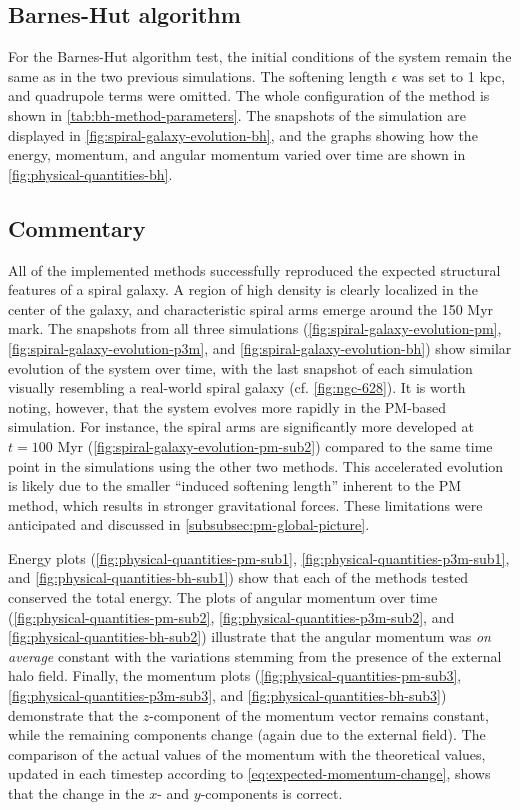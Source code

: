 \subsection{Barnes-Hut algorithm}
For the Barnes-Hut algorithm test, the initial conditions of the system remain the same as in the two previous simulations.
The softening length $\epsilon$ was set to 1 kpc, and quadrupole terms were omitted.
The whole configuration of the method is shown in \autoref{tab:bh-method-parameters}.
The snapshots of the simulation are displayed in \autoref{fig:spiral-galaxy-evolution-bh}, and the graphs showing how the energy, momentum, and angular momentum varied over time are shown in \autoref{fig:physical-quantities-bh}.

\subsection{Commentary}
All of the implemented methods successfully reproduced the expected structural features of a spiral galaxy.
A region of high density is clearly localized in the center of the galaxy, and characteristic spiral arms emerge around the 150 Myr mark.
The snapshots from all three simulations (\autoref{fig:spiral-galaxy-evolution-pm}, \autoref{fig:spiral-galaxy-evolution-p3m}, and \autoref{fig:spiral-galaxy-evolution-bh}) show similar evolution of the system over time, with the last snapshot of each simulation visually resembling a real-world spiral galaxy (cf. \autoref{fig:ngc-628}).
It is worth noting, however, that the system evolves more rapidly in the PM-based simulation.
For instance, the spiral arms are significantly more developed at $t = 100$ Myr (\autoref{fig:spiral-galaxy-evolution-pm-sub2}) compared to the same time point in the simulations using the other two methods.
This accelerated evolution is likely due to the smaller ``induced softening length'' inherent to the PM method, which results in stronger gravitational forces. These limitations were anticipated and discussed in \autoref{subsubsec:pm-global-picture}.

Energy plots (\autoref{fig:physical-quantities-pm-sub1}, \autoref{fig:physical-quantities-p3m-sub1}, and \autoref{fig:physical-quantities-bh-sub1}) show that each of the methods tested conserved the total energy.
The plots of angular momentum over time (\autoref{fig:physical-quantities-pm-sub2}, \autoref{fig:physical-quantities-p3m-sub2}, and \autoref{fig:physical-quantities-bh-sub2}) illustrate that the angular momentum was \textit{on average} constant with the variations stemming from the presence of the external halo field.
Finally, the momentum plots (\autoref{fig:physical-quantities-pm-sub3}, \autoref{fig:physical-quantities-p3m-sub3}, and \autoref{fig:physical-quantities-bh-sub3}) demonstrate that the $z$-component of the momentum vector remains constant, while the remaining components change (again due to the external field).
The comparison of the actual values of the momentum with the theoretical values, updated in each timestep according to \autoref{eq:expected-momentum-change}, shows that the change in the $x$- and $y$-components is correct.
